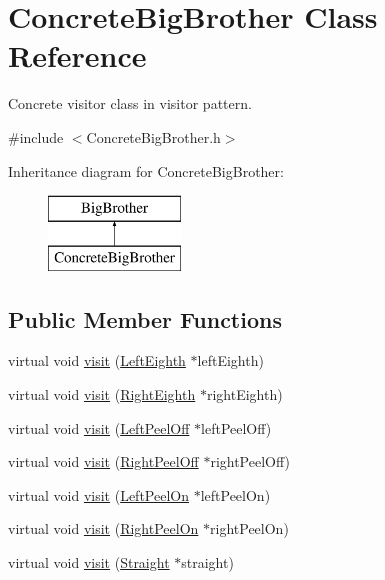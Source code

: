 \hypertarget{class_concrete_big_brother}{}\section{Concrete\+Big\+Brother Class Reference}
\label{class_concrete_big_brother}


Concrete visitor class in visitor pattern.  




{\ttfamily \#include $<$Concrete\+Big\+Brother.\+h$>$}

Inheritance diagram for Concrete\+Big\+Brother\+:\begin{figure}[H]
\begin{center}
\leavevmode
\includegraphics[height=2.000000cm]{class_concrete_big_brother}
\end{center}
\end{figure}
\subsection*{Public Member Functions}
\begin{DoxyCompactItemize}
\item 
virtual void \mbox{\hyperlink{class_concrete_big_brother_a9c9e11e8ed4b7a2c0c33850f481f4402}{visit}} (\mbox{\hyperlink{class_left_eighth}{Left\+Eighth}} $\ast$left\+Eighth)
\item 
virtual void \mbox{\hyperlink{class_concrete_big_brother_a693ed9fb8fb4a18843f6a8d8abb878d4}{visit}} (\mbox{\hyperlink{class_right_eighth}{Right\+Eighth}} $\ast$right\+Eighth)
\item 
virtual void \mbox{\hyperlink{class_concrete_big_brother_ab74422b56214550d74c956f408960d87}{visit}} (\mbox{\hyperlink{class_left_peel_off}{Left\+Peel\+Off}} $\ast$left\+Peel\+Off)
\item 
virtual void \mbox{\hyperlink{class_concrete_big_brother_a972dde2c8065422c01a323b010f4ffdf}{visit}} (\mbox{\hyperlink{class_right_peel_off}{Right\+Peel\+Off}} $\ast$right\+Peel\+Off)
\item 
virtual void \mbox{\hyperlink{class_concrete_big_brother_ad936670c1591d213dda894fd72e87421}{visit}} (\mbox{\hyperlink{class_left_peel_on}{Left\+Peel\+On}} $\ast$left\+Peel\+On)
\item 
virtual void \mbox{\hyperlink{class_concrete_big_brother_aca0d91bd7605b59f9aaa2baf9763ceb3}{visit}} (\mbox{\hyperlink{class_right_peel_on}{Right\+Peel\+On}} $\ast$right\+Peel\+On)
\item 
virtual void \mbox{\hyperlink{class_concrete_big_brother_a056169cb0e91f4ace1229d7caa2ee5d2}{visit}} (\mbox{\hyperlink{class_straight}{Straight}} $\ast$straight)
\end{DoxyCompactItemize}


